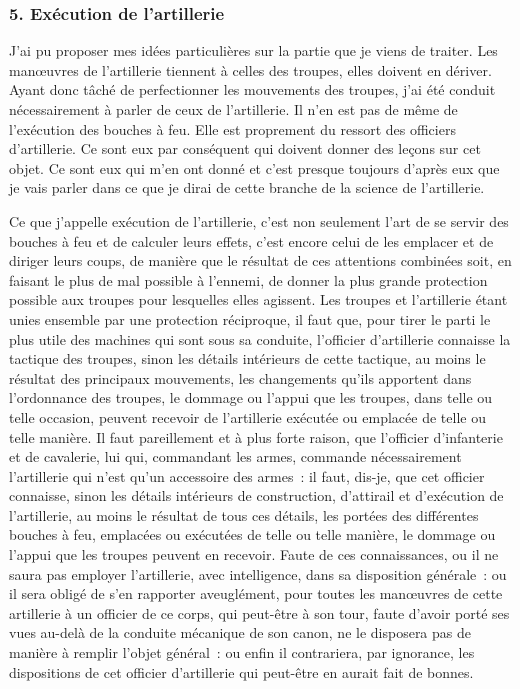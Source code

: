 \documentclass[french,twoside]{book} %
\begin{document}
\subsubsection[{5. Exécution de l’artillerie}]{5. Exécution de l’artillerie}
\noindent J’ai pu proposer mes idées particulières sur la partie que je viens de traiter. Les manœuvres de l’artillerie tiennent à celles des troupes, elles doivent en dériver. Ayant donc tâché de perfectionner les mouvements des troupes, j’ai été conduit nécessairement à parler de ceux de l’artillerie. Il n’en est pas de même de l’exécution des bouches à feu. Elle est proprement du ressort des officiers d’artillerie. Ce sont eux par conséquent qui doivent donner des leçons sur cet objet. Ce sont eux qui m’en ont donné et c’est presque toujours d’après eux que je vais parler dans ce que je dirai de cette branche de la science de l’artillerie.\par
Ce que j’appelle exécution de l’artillerie, c’est non seulement l’art de se servir des bouches à feu et de calculer leurs effets, c’est encore celui de les emplacer et de diriger leurs coups, de manière que le résultat de ces attentions combinées soit, en faisant le plus de mal possible à l’ennemi, de donner la plus grande protection possible aux troupes pour lesquelles elles agissent. Les troupes et l’artillerie étant unies ensemble par une protection réciproque, il faut que, pour tirer le parti le plus utile des machines qui sont sous sa conduite, l’officier d’artillerie connaisse la tactique des troupes, sinon les détails intérieurs de cette tactique, au moins le résultat des principaux mouvements, les changements qu’ils apportent dans l’ordonnance des troupes, le dommage ou l’appui que les troupes, dans telle ou telle occasion, peuvent recevoir de l’artillerie exécutée ou emplacée de telle ou telle manière. Il faut pareillement et à plus forte raison, que l’officier d’infanterie et de cavalerie, lui qui, commandant les armes, commande nécessairement l’artillerie qui n’est qu’un accessoire des armes : il faut, dis-je, que cet officier connaisse, sinon les détails intérieurs de construction, d’attirail et d’exécution de l’artillerie, au moins le résultat de tous ces détails, les portées des différentes bouches à feu, emplacées ou exécutées de telle ou telle manière, le dommage ou l’appui que les troupes peuvent en recevoir. Faute de ces connaissances, ou il ne saura pas employer l’artillerie, avec intelligence, dans sa disposition générale : ou il sera obligé de s’en rapporter aveuglément, pour toutes les manœuvres de cette artillerie à un officier de ce corps, qui peut-être à son tour, faute d’avoir porté ses vues au-delà de la conduite mécanique de son canon, ne le disposera pas de manière à remplir l’objet général : ou enfin il contrariera, par ignorance, les dispositions de cet officier d’artillerie qui peut-être en aurait fait de bonnes.\par
\end{document}
